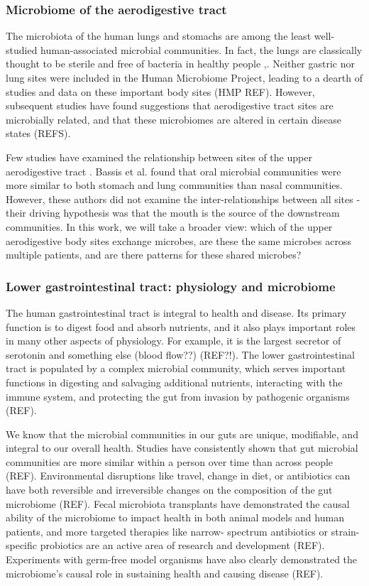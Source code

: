 \documentclass[12pt]{article}
\begin{document}
\subsubsection{Microbiome of the aerodigestive tract}
The microbiota of the human lungs and stomachs are among the least 
well-studied human-associated microbial communities. In fact, the 
lungs are classically thought to be sterile and free of bacteria in 
healthy people \cite{charslon-topographical-2011},\cite{bassis-source-2015}. 
Neither gastric nor lung sites were included in the 
Human Microbiome Project, leading to a dearth of studies and data on 
these important body sites (HMP REF). However, subsequent studies have 
found suggestions that aerodigestive tract sites are microbially 
related, and that these microbiomes are altered in certain disease 
states (REFS).


Few studies have examined the relationship between sites of the upper 
aerodigestive tract \cite{bassis-source-2015}. Bassis et al. found 
that oral microbial communities were more similar to both stomach and 
lung communities than nasal communities. However, these authors did 
not examine the inter-relationships between all sites - their driving 
hypothesis was that the mouth is the source of the downstream 
communities. In this work, we will take a broader view: which of the 
upper aerodigestive body sites exchange microbes, are these the same 
microbes across multiple patients, and are there  patterns for these 
shared microbes? 

\subsubsection{Lower gastrointestinal tract: physiology and microbiome}
The human gastrointestinal tract is integral to health and disease. 
Its primary function is to digest food and absorb nutrients, and it 
also plays important roles in many other aspects of physiology. For 
example, it is the largest secretor of serotonin and something else 
(blood flow??) (REF?!). The lower gastrointestinal tract is populated 
by a complex microbial community, which serves important functions in 
digesting and salvaging additional nutrients, interacting with the 
immune system, and protecting the gut from invasion by pathogenic 
organisms (REF). 

We know that the microbial communities in our guts are unique, 
modifiable, and integral to our overall health. Studies have 
consistently shown that gut microbial communities are more similar 
within a person over time than across people (REF). Environmental 
disruptions like travel, change in diet, or antibiotics can have both 
reversible and irreversible changes on the composition of the gut 
microbiome (REF). Fecal microbiota transplants have demonstrated the 
causal ability of the microbiome to impact health in both animal 
models and human patients, and more targeted therapies like narrow-
spectrum antibiotics or strain-specific probiotics are an active area 
of research and development (REF). Experiments with germ-free model 
organisms have also clearly demonstrated the microbiome's causal role 
in sustaining health and causing disease (REF).
\end{document}
